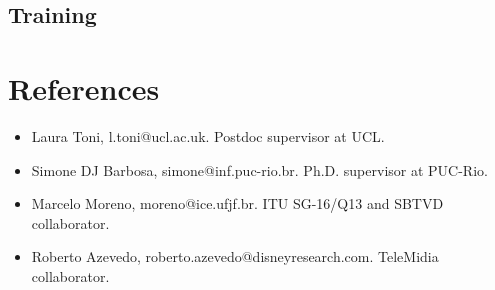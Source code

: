 \documentclass[10pt,a4paper,sans,colorlinks]{moderncv}
\begin{document}
\subsection{Training}

\section{References}

\begin{itemize}
  \item Laura Toni, l.toni@ucl.ac.uk. Postdoc supervisor at UCL.
  \item Simone DJ Barbosa, simone@inf.puc-rio.br. Ph.D. supervisor at PUC-Rio.
  \item Marcelo Moreno, moreno@ice.ufjf.br. ITU SG-16/Q13 and SBTVD collaborator.
  \item Roberto Azevedo, roberto.azevedo@disneyresearch.com. TeleMidia collaborator.
\end{itemize}
\end{document}
